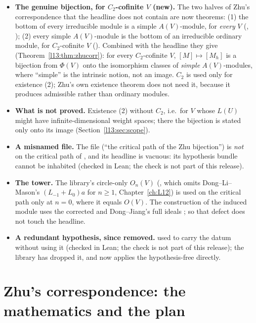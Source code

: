 \begin{itemize}
\item \textbf{The genuine bijection, for $C_2$-cofinite $V$ (new).} The two halves of Zhu's correspondence that the
  headline does not contain are now theorems: (1) the bottom of every irreducible module is a simple $A(V)$-module, for
  \emph{every} $V$ (, ); (2) every simple $A(V)$-module is
  the bottom of an irreducible ordinary module, for $C_2$-cofinite $V$ (). Combined
  with the headline they give  (Theorem~\ref{l13:thm:zhucorr}): for every $C_2$-cofinite
  $V$, $[M]\mapsto[M_h]$ is a bijection from $\Phi(V)$ onto the isomorphism classes of \emph{simple} $A(V)$-modules, where
  ``simple'' is the intrinsic notion, not an image. $C_2$ is used only for existence (2); Zhu's own existence theorem does
  not need it, because it produces admissible rather than ordinary modules.
\item \textbf{What is not proved.} Existence (2) without $C_2$, i.e.\ for $V$ whose $L(U)$ might have infinite-dimensional
  weight spaces; there the bijection is stated only onto its image (Section~\ref{l13:sec:scope}).
\item \textbf{A misnamed file.} The file 
  (``the critical path of the Zhu bijection'') is \emph{not} on the critical path of , and its
  headline  is vacuous: its hypothesis bundle cannot be inhabited (checked in Lean; the check is
  not part of this release).
\item \textbf{The tower.} The library's circle-only $O_n(V)$ (, which omits Dong--Li--Mason's
  $(L_{-1}+L_0)a$ for $n\ge1$, Chapter~\ref{ch:L12}) is used on the critical path only at $n = 0$, where it equals
  $O(V)$. The construction of the induced module uses the corrected  and Dong--Jiang's full ideals
  ; so that defect does not touch the headline.
\item \textbf{A redundant hypothesis, since removed.}  used to carry the datum  without using it
  (checked in Lean; the check is not part of this release); the library has dropped it, and  now applies the hypothesis-free  directly.
\end{itemize}

\section{Zhu's correspondence: the mathematics and the plan}\label{l13:sec:plan}

